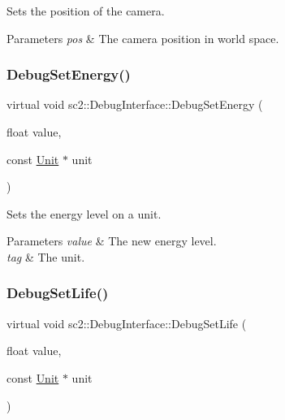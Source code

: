 Sets the position of the camera. 
\begin{DoxyParams}{Parameters}
{\em pos} & The camera position in world space. \\
\hline
\end{DoxyParams}
\mbox{\label{classsc2_1_1_debug_interface_ad9a0d12a1cb638e2c48ecbe5fb492d00}} 
\subsubsection{\texorpdfstring{Debug\+Set\+Energy()}{DebugSetEnergy()}}
{\footnotesize\ttfamily virtual void sc2\+::\+Debug\+Interface\+::\+Debug\+Set\+Energy (\begin{DoxyParamCaption}\item[{float}]{value,  }\item[{const \hyperlink{classsc2_1_1_unit}{Unit} $\ast$}]{unit }\end{DoxyParamCaption})\hspace{0.3cm}{\ttfamily [pure virtual]}}

Sets the energy level on a unit. 
\begin{DoxyParams}{Parameters}
{\em value} & The new energy level. \\
\hline
{\em tag} & The unit. \\
\hline
\end{DoxyParams}
\mbox{\label{classsc2_1_1_debug_interface_a30ea1ea267baf1a5a0ac8f0cf9a7d679}} 
\subsubsection{\texorpdfstring{Debug\+Set\+Life()}{DebugSetLife()}}
{\footnotesize\ttfamily virtual void sc2\+::\+Debug\+Interface\+::\+Debug\+Set\+Life (\begin{DoxyParamCaption}\item[{float}]{value,  }\item[{const \hyperlink{classsc2_1_1_unit}{Unit} $\ast$}]{unit }\end{DoxyParamCaption})\hspace{0.3cm}{\ttfamily [pure virtual]}}

